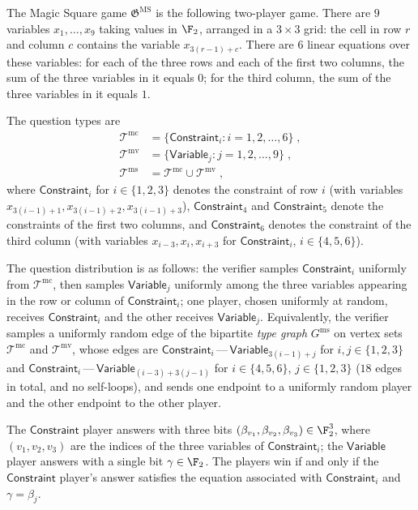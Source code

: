 \begin{definition}\label{def:ms-game}
	The Magic Square game $\mathfrak{G}^{\mathrm{MS}}$ is the following two-player game. There are $9$ variables $x_1,\ldots,x_9$ taking values in $\F_2$, arranged in a $3 \times 3$ grid: the cell in row $r$ and column $c$ contains the variable $x_{3(r-1)+c}$. There are $6$ linear equations over these variables: for each of the three rows and each of the first two columns, the sum of the three variables in it equals $0$; for the third column, the sum of the three variables in it equals $1$.

	The question types are
	\begin{align*}
		\mathcal T^{\mathrm{mc}} &= \{\mathsf{Constraint}_i : i = 1,2,\ldots,6\}\;,\\
		\mathcal T^{\mathrm{mv}} &= \{\mathsf{Variable}_j : j = 1,2,\ldots,9\}\;,\\
		\mathcal T^{\mathrm{ms}} &= \mathcal T^{\mathrm{mc}} \cup \mathcal T^{\mathrm{mv}}\;,
	\end{align*}
	where $\mathsf{Constraint}_i$ for $i \in \{1,2,3\}$ denotes the constraint of row $i$ (with variables $x_{3(i-1)+1}, x_{3(i-1)+2}, x_{3(i-1)+3}$), $\mathsf{Constraint}_4$ and $\mathsf{Constraint}_5$ denote the constraints of the first two columns, and $\mathsf{Constraint}_6$ denotes the constraint of the third column (with variables $x_{i-3}, x_{i}, x_{i+3}$ for $\mathsf{Constraint}_i$, $i \in \{4,5,6\}$).

	The question distribution is as follows: the verifier samples $\mathsf{Constraint}_i$ uniformly from $\mathcal T^{\mathrm{mc}}$, then samples $\mathsf{Variable}_j$ uniformly among the three variables appearing in the row or column of $\mathsf{Constraint}_i$; one player, chosen uniformly at random, receives $\mathsf{Constraint}_i$ and the other receives $\mathsf{Variable}_j$. Equivalently, the verifier samples a uniformly random edge of the bipartite \emph{type graph} $G^{\mathrm{ms}}$ on vertex sets $\mathcal T^{\mathrm{mc}}$ and $\mathcal T^{\mathrm{mv}}$, whose edges are $\mathsf{Constraint}_i \,\text{---}\, \mathsf{Variable}_{3(i-1)+j}$ for $i,j \in \{1,2,3\}$ and $\mathsf{Constraint}_i \,\text{---}\, \mathsf{Variable}_{(i-3)+3(j-1)}$ for $i \in \{4,5,6\}$, $j \in \{1,2,3\}$ ($18$ edges in total, and no self-loops), and sends one endpoint to a uniformly random player and the other endpoint to the other player.

	The $\mathsf{Constraint}$ player answers with three bits $(\beta_{v_1}, \beta_{v_2}, \beta_{v_3}) \in \F_2^3$, where $(v_1,v_2,v_3)$ are the indices of the three variables of $\mathsf{Constraint}_i$; the $\mathsf{Variable}$ player answers with a single bit $\gamma \in \F_2$. The players win if and only if the $\mathsf{Constraint}$ player's answer satisfies the equation associated with $\mathsf{Constraint}_i$ and $\gamma = \beta_j$.
\end{definition}

